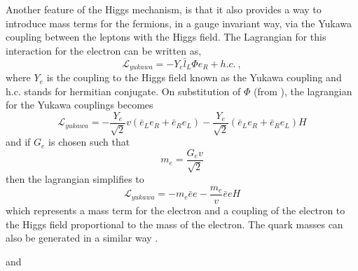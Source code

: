 Another feature of the Higgs mechanism, is that it also provides a way to
introduce mass terms for the fermions, in a gauge invariant way, via the Yukawa
coupling between the leptons with the Higgs field. The Lagrangian for this
interaction for the electron can be written as, 
\begin{equation}
\mathcal{L}_{yukawa} = -Y_{e}\bar{l}_L\Phi e_R + h.c. \ ,
\end{equation}
where $Y_{e}$ is the coupling to the Higgs field known as the Yukawa coupling
and h.c. stands for hermitian conjugate. On substitution of $\Phi$ (from
\EquationRef{}), the lagrangian for the Yukawa couplings becomes
\begin{equation}
\mathcal{L}_{yukawa} = 
-\frac{Y_{e}}{\sqrt{2}} v
(\bar{e}_L e_R + \bar{e}_R e_L)
-\frac{Y_{e}}{\sqrt{2}}
(\bar{e}_L e_R + \bar{e}_R e_L)H
\end{equation}
and if $G_e$ is chosen such that
\begin{equation}
m_{e} = \frac{G_{e}v}{\sqrt{2}}
\end{equation}
then the lagrangian simplifies to
\begin{equation}
\mathcal{L}_{yukawa} = 
- m_e \bar{e}e
- \frac{m_e}{v} \bar{e}e H
\end{equation}
which represents a mass term for the electron and a coupling of the electron to
the Higgs field proportional to the mass of the electron.
The quark masses can also be generated in a similar way \cite{halzen}.

\cite{aad2012observation} and \cite{chatrchyan2012observation}

